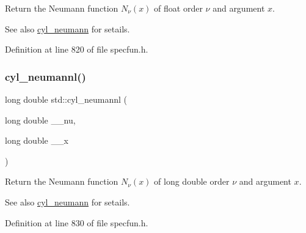Return the Neumann function $ N_{\nu}(x) $ of {\ttfamily float} order $ \nu $ and argument $ x $.

\begin{DoxySeeAlso}{See also}
\hyperlink{group__tr29124__math__spec__func_ga1e4bef23704469b0704cf15c5f04e29e}{cyl\+\_\+neumann} for setails. 
\end{DoxySeeAlso}


Definition at line 820 of file specfun.\+h.

\mbox{\label{group__tr29124__math__spec__func_gaf8986bae9a523c48d861d233835bda8f}} 
\subsubsection{\texorpdfstring{cyl\+\_\+neumannl()}{cyl\_neumannl()}}
{\footnotesize\ttfamily long double std\+::cyl\+\_\+neumannl (\begin{DoxyParamCaption}\item[{long double}]{\+\_\+\+\_\+nu,  }\item[{long double}]{\+\_\+\+\_\+x }\end{DoxyParamCaption})\hspace{0.3cm}{\ttfamily [inline]}}

Return the Neumann function $ N_{\nu}(x) $ of {\ttfamily long double} order $ \nu $ and argument $ x $.

\begin{DoxySeeAlso}{See also}
\hyperlink{group__tr29124__math__spec__func_ga1e4bef23704469b0704cf15c5f04e29e}{cyl\+\_\+neumann} for setails. 
\end{DoxySeeAlso}


Definition at line 830 of file specfun.\+h.

\mbox{\label{group__tr29124__math__spec__func_ga1550d6947bbbeee9865aabd398102a36}} 
